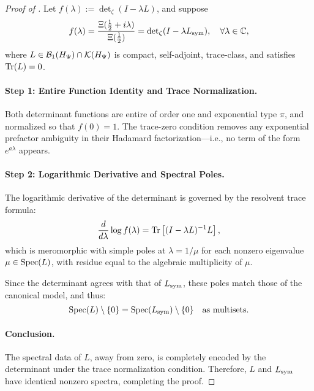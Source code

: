 \begin{proof}[Proof of ]
Let \( f(\lambda) := \det\nolimits_\zeta(I - \lambda L) \), and suppose
\[
f(\lambda) = \frac{\Xi(\tfrac{1}{2} + i\lambda)}{\Xi(\tfrac{1}{2})}
= \det\nolimits_\zeta(I - \lambda L_{\mathrm{sym}}),
\quad \forall \lambda \in \mathbb{C},
\]
where \( L \in \mathcal{B}_1(H_{\Psi}) \cap \mathcal{K}(H_{\Psi}) \) is compact, self-adjoint, trace-class, and satisfies \( \operatorname{Tr}(L) = 0 \).

\paragraph{Step 1: Entire Function Identity and Trace Normalization.}
Both determinant functions are entire of order one and exponential type \( \pi \), and normalized so that \( f(0) = 1 \). The trace-zero condition removes any exponential prefactor ambiguity in their Hadamard factorization—i.e., no term of the form \( e^{a\lambda} \) appears.

\paragraph{Step 2: Logarithmic Derivative and Spectral Poles.}
The logarithmic derivative of the determinant is governed by the resolvent trace formula:
\[
\frac{d}{d\lambda} \log f(\lambda)
= \operatorname{Tr}\left[(I - \lambda L)^{-1} L\right],
\]
which is meromorphic with simple poles at \( \lambda = 1/\mu \) for each nonzero eigenvalue \( \mu \in \operatorname{Spec}(L) \), with residue equal to the algebraic multiplicity of \( \mu \).

Since the determinant agrees with that of \( L_{\mathrm{sym}} \), these poles match those of the canonical model, and thus:
\[
\operatorname{Spec}(L) \setminus \{0\} = \operatorname{Spec}(L_{\mathrm{sym}}) \setminus \{0\}
\quad \text{as multisets}.
\]

\paragraph{Conclusion.}
The spectral data of \( L \), away from zero, is completely encoded by the determinant under the trace normalization condition. Therefore, \( L \) and \( L_{\mathrm{sym}} \) have identical nonzero spectra, completing the proof.
\end{proof}
